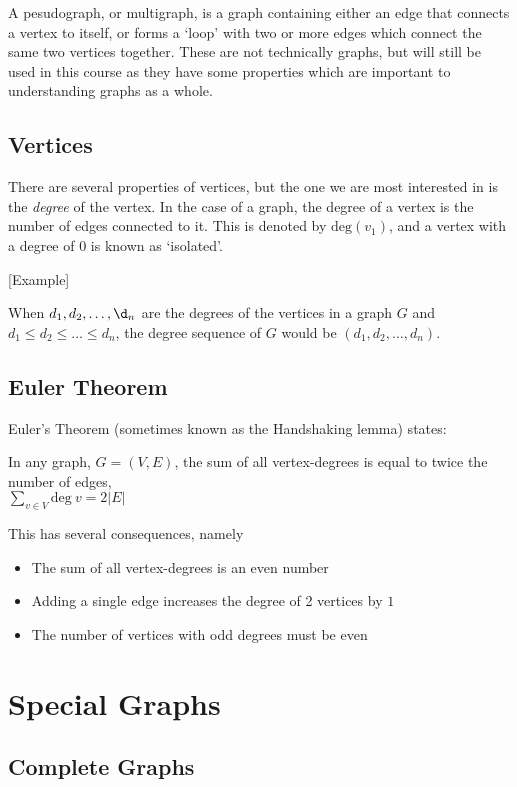 A pesudograph, or multigraph, is a graph containing either an edge that connects a vertex to itself, or forms a `loop'
 with two or more edges which connect the same two vertices together. These are not technically graphs, but will still
 be used in this course as they have some properties which are important to understanding graphs as a whole.

\subsection*{Vertices}

There are several properties of vertices, but the one we are most interested in is the \textit{degree} of the vertex. In
 the case of a graph, the degree of a vertex is the number of edges connected to it. This is denoted by $\mathrm{deg}(v_1)$,
 and a vertex with a degree of $0$ is known as `isolated'.

[Example]

When $d_1, d_2, \dots, \d_n$ are the degrees of the vertices in a graph $G$ and $d_1 \leq d_2 \leq \ldots \leq d_n$, the
 degree sequence of $G$ would be $(d_1, d_2, \dots, d_n)$.

\subsection*{Euler Theorem}

Euler's Theorem (sometimes known as the Handshaking lemma) states:
\begin{center}
  In any graph, $G = (V, E)$, the sum of all vertex-degrees is equal to twice the number of edges,\\
  $\sum_{v \in V} \mathrm{deg\ } v = 2 \lvert E \rvert$
\end{center}

This has several consequences, namely
\begin{itemize}
  \item The sum of all vertex-degrees is an even number
  \item Adding a single edge increases the degree of 2 vertices by $1$
  \item The number of vertices with odd degrees must be even
\end{itemize}

\section*{Special Graphs}

\subsection*{Complete Graphs}


